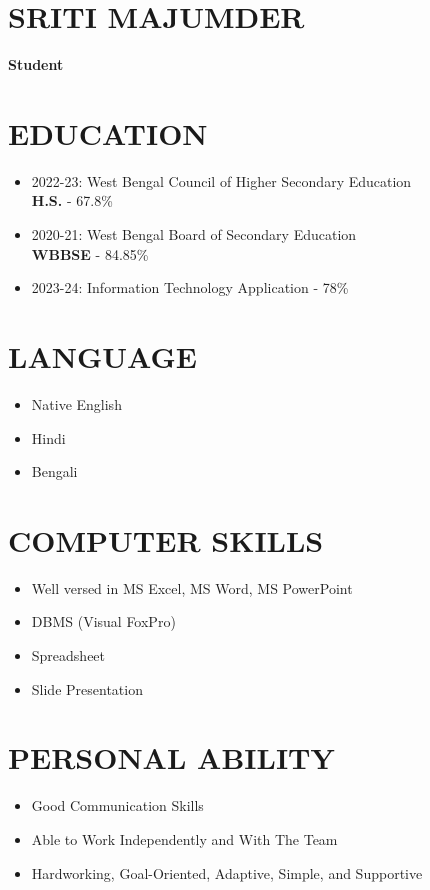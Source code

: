 \documentclass[12pt]{article}
\begin{document}
\begin{minipage}{0.65\textwidth}
    \section*{SRITI MAJUMDER}
    \textbf{Student}
    
    \section*{EDUCATION}
    \begin{itemize}
        \item 2022-23: West Bengal Council of Higher Secondary Education \\
        \textbf{H.S.} - 67.8\%
        \item 2020-21: West Bengal Board of Secondary Education \\
        \textbf{WBBSE} - 84.85\%
        \item 2023-24: Information Technology Application - 78\%
    \end{itemize}
    
    \section*{LANGUAGE}
    \begin{itemize}
        \item Native English
        \item Hindi
        \item Bengali
    \end{itemize}
    
    \section*{COMPUTER SKILLS}
    \begin{itemize}
        \item Well versed in MS Excel, MS Word, MS PowerPoint
        \item DBMS (Visual FoxPro)
        \item Spreadsheet
        \item Slide Presentation
    \end{itemize}
    
    \section*{PERSONAL ABILITY}
    \begin{itemize}
        \item Good Communication Skills
        \item Able to Work Independently and With The Team
        \item Hardworking, Goal-Oriented, Adaptive, Simple, and Supportive
    \end{itemize}
    
\end{minipage}
\end{document}
